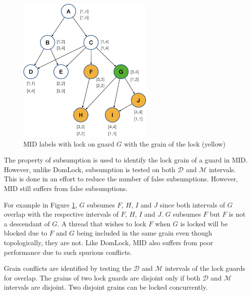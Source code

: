 
\begin{figure}[H]
    \centering
    \captionsetup{justification=centering}
    \includegraphics[width=0.6\textwidth]{figures/MID_example_with_lock.png}
    \caption{MID labels with lock on guard $G$ with the grain of the lock (yellow)}
    \label{fig:MID_example_locked}
\end{figure}


The property of subsumption is used to identify the lock grain of a guard in MID. However, unlike DomLock, subsumption is tested on  both $\mathcal{D}$ and $\mathcal{M}$ intervals. 
This is done in an effort to reduce the number of false subsumptions. However, MID still suffers from false subsumptions.


For example in Figure \ref{fig:MID_example_locked}, $G$ subsumes $F$, $H$, $I$ and $J$ since both intervals of $G$ overlap with the respective intervals of $F$, $H$, $I$ and $J$. $G$ subsumes $F$ but $F$ is not a descendant of $G$. A thread that wishes to lock $F$ when $G$ is locked will be blocked due to $F$ and $G$ being included in the same grain even though topologically, they are not. Like DomLock, MID also suffers from poor performance due to such spurious conflicts.

Grain conflicts are identified by testing the $\mathcal{D}$ and $\mathcal{M}$ intervals of the lock guards for overlap. The grains of two lock guards are disjoint only if both $\mathcal{D}$ and $\mathcal{M}$ intervals are disjoint. Two disjoint grains can be locked concurrently. 


